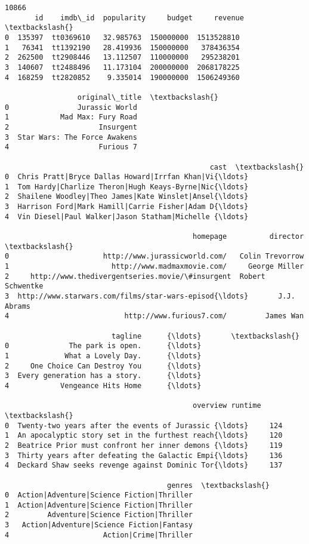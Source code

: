 \documentclass[11pt]{article}
\begin{document}
    \begin{Verbatim}[commandchars=\\\{\}]
10866
       id    imdb\_id  popularity     budget     revenue  \textbackslash{}
0  135397  tt0369610   32.985763  150000000  1513528810   
1   76341  tt1392190   28.419936  150000000   378436354   
2  262500  tt2908446   13.112507  110000000   295238201   
3  140607  tt2488496   11.173104  200000000  2068178225   
4  168259  tt2820852    9.335014  190000000  1506249360   

                 original\_title  \textbackslash{}
0                Jurassic World   
1            Mad Max: Fury Road   
2                     Insurgent   
3  Star Wars: The Force Awakens   
4                     Furious 7   

                                                cast  \textbackslash{}
0  Chris Pratt|Bryce Dallas Howard|Irrfan Khan|Vi{\ldots}   
1  Tom Hardy|Charlize Theron|Hugh Keays-Byrne|Nic{\ldots}   
2  Shailene Woodley|Theo James|Kate Winslet|Ansel{\ldots}   
3  Harrison Ford|Mark Hamill|Carrie Fisher|Adam D{\ldots}   
4  Vin Diesel|Paul Walker|Jason Statham|Michelle {\ldots}   

                                            homepage          director  \textbackslash{}
0                      http://www.jurassicworld.com/   Colin Trevorrow   
1                        http://www.madmaxmovie.com/     George Miller   
2     http://www.thedivergentseries.movie/\#insurgent  Robert Schwentke   
3  http://www.starwars.com/films/star-wars-episod{\ldots}       J.J. Abrams   
4                           http://www.furious7.com/         James Wan   

                         tagline      {\ldots}       \textbackslash{}
0              The park is open.      {\ldots}        
1             What a Lovely Day.      {\ldots}        
2     One Choice Can Destroy You      {\ldots}        
3  Every generation has a story.      {\ldots}        
4            Vengeance Hits Home      {\ldots}        

                                            overview runtime  \textbackslash{}
0  Twenty-two years after the events of Jurassic {\ldots}     124   
1  An apocalyptic story set in the furthest reach{\ldots}     120   
2  Beatrice Prior must confront her inner demons {\ldots}     119   
3  Thirty years after defeating the Galactic Empi{\ldots}     136   
4  Deckard Shaw seeks revenge against Dominic Tor{\ldots}     137   

                                      genres  \textbackslash{}
0  Action|Adventure|Science Fiction|Thriller   
1  Action|Adventure|Science Fiction|Thriller   
2         Adventure|Science Fiction|Thriller   
3   Action|Adventure|Science Fiction|Fantasy   
4                      Action|Crime|Thriller   


\end{Verbatim}
\end{document}
